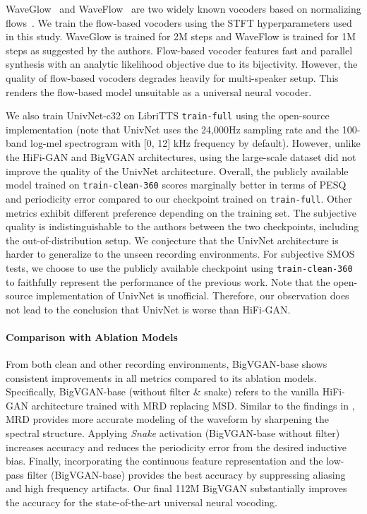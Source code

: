 \documentclass{article} \usepackage{iclr2023_conference,times}
\theoremstyle{plain}
\theoremstyle{definition}
\theoremstyle{remark}
\begin{document}
WaveGlow~\citep{prenger2019waveglow} and WaveFlow~\citep{ping2019waveflow} are two widely known vocoders based on normalizing flows~\citep{rezende2015variational}. We train the flow-based vocoders using the STFT hyperparameters used in this study. WaveGlow is trained for 2M steps and WaveFlow is trained for 1M steps as suggested by the authors. Flow-based vocoder features fast and parallel synthesis with an analytic likelihood objective due to its bijectivity. However, the quality of flow-based vocoders degrades heavily for multi-speaker setup. This renders the flow-based model unsuitable as a universal neural vocoder.

We also train UnivNet-c32 \citep{jang2021univnet} on LibriTTS \texttt{train-full} using the open-source implementation (note that UnivNet uses the 24,000Hz sampling rate and the 100-band log-mel spectrogram with [0, 12] kHz frequency by default). However, unlike the HiFi-GAN and BigVGAN architectures, using the large-scale dataset did not improve the quality of the UnivNet architecture. Overall, the publicly available model trained on \texttt{train-clean-360} scores marginally better in terms of PESQ and periodicity error compared to our checkpoint trained on \texttt{train-full}. Other metrics exhibit different preference depending on the training set. The subjective quality is indistinguishable to the authors between the two checkpoints, including the out-of-distribution setup. We conjecture that the UnivNet architecture is harder to generalize to the unseen recording environments. For subjective SMOS tests, we choose to use the publicly available checkpoint using \texttt{train-clean-360} to faithfully represent the performance of the previous work. Note that the open-source implementation of UnivNet is unofficial. Therefore, our observation does not lead to the conclusion that UnivNet is worse than HiFi-GAN.

\paragraph{Comparison with Ablation Models}
From both clean and other recording environments, BigVGAN-base shows consistent improvements in all metrics compared to its ablation models. Specifically, BigVGAN-base (without filter \& snake) refers to the vanilla HiFi-GAN architecture trained with MRD replacing MSD. Similar to the findings in \citep{jang2021univnet}, MRD provides more accurate modeling of the waveform by sharpening the spectral structure. Applying \emph{Snake} activation (BigVGAN-base without filter) increases accuracy and reduces the periodicity error from the desired inductive bias. Finally, incorporating the continuous feature representation and the low-pass filter (BigVGAN-base) provides the best accuracy by suppressing aliasing and high frequency artifacts. Our final 112M BigVGAN substantially improves the accuracy for the state-of-the-art universal neural vocoding.
\end{document}
